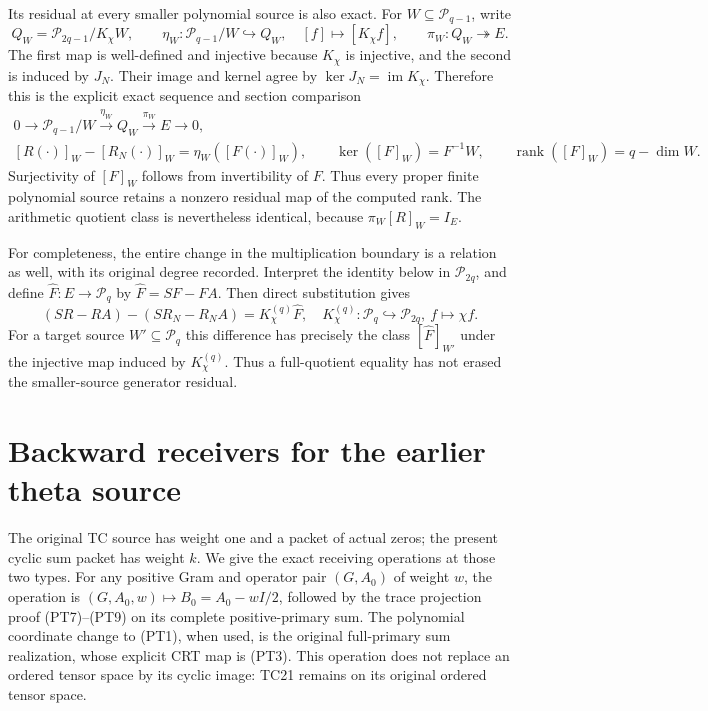 \documentclass[11pt]{article}
\newcommand{\PP}{\mathcal P}
\DeclareMathOperator{\rank}{rank}
\DeclareMathOperator{\im}{im}
\begin{document}
Its residual at every smaller polynomial source is also exact.
For \(W\subseteq\PP_{q-1}\), write
\[
 Q_W=\PP_{2q-1}/K_\chi W,\qquad
 \eta_W:\PP_{q-1}/W\hookrightarrow Q_W,\quad
 [f]\mapsto[K_\chi f],\qquad
 \pi_W:Q_W\twoheadrightarrow E.
\]
The first map is well-defined and injective because \(K_\chi\)
is injective, and the second is induced by \(J_N\).
Their image and kernel agree by \(\ker J_N=\im K_\chi\).
Therefore this is the explicit exact sequence and section comparison
\begin{equation}\tag{PT30}
 \begin{gathered}
 0\longrightarrow\PP_{q-1}/W\xrightarrow{\eta_W}Q_W
   \xrightarrow{\pi_W}E\longrightarrow0,\\
 [R(\cdot)]_W-[R_N(\cdot)]_W=\eta_W([F(\cdot)]_W),\qquad
 \ker([F]_W)=F^{-1}W,\qquad
 \rank([F]_W)=q-\dim W.
 \end{gathered}
\end{equation}
Surjectivity of \([F]_W\) follows from invertibility of \(F\).
Thus every proper finite polynomial source retains a nonzero
residual map of the computed rank. The arithmetic quotient class
is nevertheless identical, because \(\pi_W[R]_W=I_E\).

For completeness, the entire change in the multiplication boundary
is a relation as well, with its original degree recorded. Interpret
the identity below in \(\PP_{2q}\), and define
\(\widehat F:E\to\PP_q\) by \(\widehat F=SF-FA\).
Then direct substitution gives
\begin{equation}\tag{PT31}
 (SR-RA)-(SR_N-R_NA)=K_\chi^{(q)}\widehat F,
 \quad K_\chi^{(q)}:\PP_q\hookrightarrow\PP_{2q},\ f\mapsto\chi f.
\end{equation}
For a target source \(W'\subseteq\PP_q\) this difference has
precisely the class \([\widehat F]_{W'}\) under the injective
map induced by \(K_\chi^{(q)}\). Thus a full-quotient equality
has not erased the smaller-source generator residual.

\section{Backward receivers for the earlier theta source}

The original TC source has weight one and a packet of actual zeros;
the present cyclic sum packet has weight \(k\). We give the exact
receiving operations at those two types. For any positive Gram and
operator pair \((G,A_0)\) of weight \(w\), the operation is
\((G,A_0,w)\mapsto B_0=A_0-wI/2\), followed by the trace
projection proof (PT7)--(PT9) on its complete positive-primary sum.
The polynomial coordinate change to (PT1), when used, is the
original full-primary sum realization, whose explicit CRT map is
(PT3). This operation does not replace an ordered tensor space by
its cyclic image: TC21 remains on its original ordered tensor space.
\end{document}
